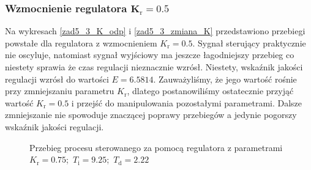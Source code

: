 \subsubsection{Wzmocnienie regulatora $\mathbf{K_{\mathrm{r}}}=\num{0,5}$}
Na wykresach \ref{zad5_3_K_odp} i \ref{zad5_3_zmiana_K} przedstawiono przebiegi powstałe 
dla regulatora z wzmocnieniem $ K_{\mathrm{r}} = \num{0,5}$. Sygnał sterujący praktycznie nie
oscyluje, natomiast sygnał wyjściowy ma jeszcze łagodniejszy przebieg co niestety sprawia że czas regulacji 
nieznacznie wzrósł. Niestety, wskaźnik jakości 
regulacji wzrósł do wartości $E=\num{6,5814}$. Zauważyliśmy, że jego wartość rośnie przy zmniejszaniu  
parametru $ K_{\mathrm{r}}$, dlatego postanowiliśmy 
ostatecznie przyjąć wartość $K_{\mathrm{r}} = \num{0,5}$ i przejść do manipulowania 
pozostałymi parametrami. Dalsze zmniejszanie nie spowoduje 
znaczącej poprawy przebiegów a jedynie pogorszy wskaźnik jakości regulacji. 


\begin{figure}[t]
    \centering
    \caption{Przebieg procesu sterowanego za pomocą regulatora z 
    parametrami \mbox{$K_{\mathrm{r}} = \num{0,75}$; $T_{\mathrm{i}} = \num{9,25}$; $T_{\mathrm{d}} = \num{2,22}$}}
    \label{zad5_1_K_odp}
\end{figure}

